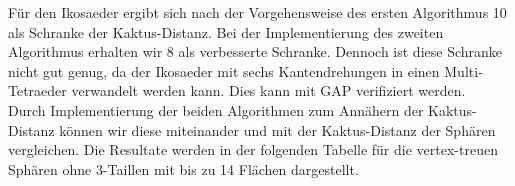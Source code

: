 \documentclass[12pt,titlepage,twoside,cleardoublepage]{article}
\theoremstyle{nummermitklammern}
\newtheorem{lemma}[temp]{Lemma}
\newtheorem{lemma}[zahl]{Lemma}
\numberwithin{equation}{section}
\begin{document}

Für den Ikosaeder ergibt sich nach der Vorgehensweise des ersten Algorithmus 10 als Schranke der Kaktus-Distanz.
Bei der Implementierung des zweiten Algorithmus erhalten wir 8 als verbesserte Schranke. Dennoch ist diese Schranke nicht gut genug, da der Ikosaeder mit sechs Kantendrehungen in einen Multi-Tetraeder verwandelt werden kann. Dies kann mit GAP verifiziert werden.\\
Durch Implementierung der beiden Algorithmen zum Annähern der Kaktus-Distanz können wir diese miteinander und mit der Kaktus-Distanz der Sphären vergleichen. Die Resultate werden in der folgenden Tabelle für die vertex-treuen Sphären ohne 3-Taillen mit bis zu 14 Flächen dargestellt. 
\end{document}
